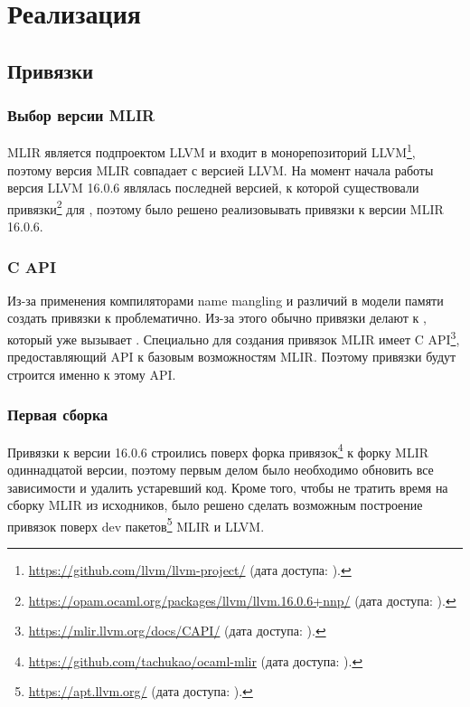 
\section{Реализация}

\subsection{Привязки}

\subsubsection{Выбор версии MLIR}
MLIR является подпроектом LLVM и входит в монорепозиторий LLVM\footnote{\url{https://github.com/llvm/llvm-project/} (дата доступа:   ).}, поэтому версия MLIR совпадает с версией LLVM. На момент начала работы версия LLVM 16.0.6 являлась последней версией, к которой существовали привязки\footnote{\url{https://opam.ocaml.org/packages/llvm/llvm.16.0.6+nnp/} (дата доступа:   ).} для \OCaml{}, поэтому было решено реализовывать привязки к версии MLIR 16.0.6.

\subsubsection{C API}

Из-за применения компиляторами \Cpp{} name mangling и различий в модели памяти создать привязки к \Cpp{} проблематично. Из-за этого обычно привязки делают к \C, который уже вызывает \Cpp{}. Специально для создания привязок MLIR имеет C API\footnote{\url{https://mlir.llvm.org/docs/CAPI/} (дата доступа:   ).}, предоставляющий API к базовым возможностям MLIR. Поэтому привязки будут строится именно к этому API.

\subsubsection{Первая сборка}

Привязки к версии 16.0.6 строились поверх форка привязок\footnote{\url{https://github.com/tachukao/ocaml-mlir} (дата доступа:   ).} к форку ML\-IR одиннадцатой версии, поэтому первым делом было необходимо обновить все зависимости и удалить устаревший код. Кроме того, чтобы не тратить время на сборку MLIR из исходников, было решено сделать возможным построение привязок поверх dev пакетов\footnote{\url{https://apt.llvm.org/} (дата доступа:   ).} MLIR и LLVM.

